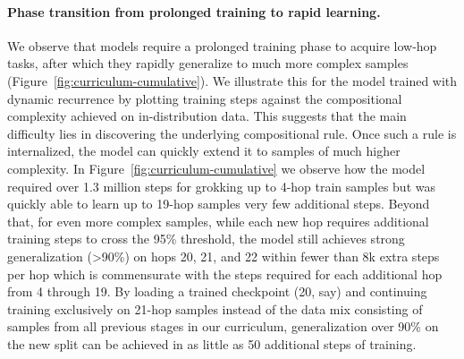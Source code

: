 \documentclass{article} %
\newcommand{\yy}[1]{\textcolor{blue}{[Yuekun: #1]}}
\begin{document}
\paragraph{Phase transition from prolonged training to rapid learning.}
We observe that models require a prolonged training phase to acquire low-hop tasks, after which they rapidly generalize to much more complex samples (Figure~\ref{fig:curriculum-cumulative}). 
We illustrate this for the model trained with dynamic recurrence by plotting training steps against the compositional complexity achieved on in-distribution data.
This suggests that the main difficulty lies in discovering the underlying compositional rule. 
Once such a rule is internalized, the model can quickly extend it to samples of much higher complexity. 
In Figure~\ref{fig:curriculum-cumulative} we observe how the model required over 1.3 million steps for grokking up to 4-hop train samples but was quickly able to learn up to 19-hop samples very few additional steps. Beyond that, for even more complex samples, while each new hop requires additional training steps to cross the 95\% threshold, the model still achieves strong generalization (\textgreater90\%) on hops 20, 21, and 22 within fewer than 8k extra steps per hop which is commensurate with the steps required for each additional hop from 4 through 19. By loading a trained checkpoint (20, say) and continuing training exclusively on 21-hop samples instead of the data mix consisting of samples from all previous stages in our curriculum, generalization over 90\% on the new split can be achieved in as little as 50 additional steps of training.




\end{document}
